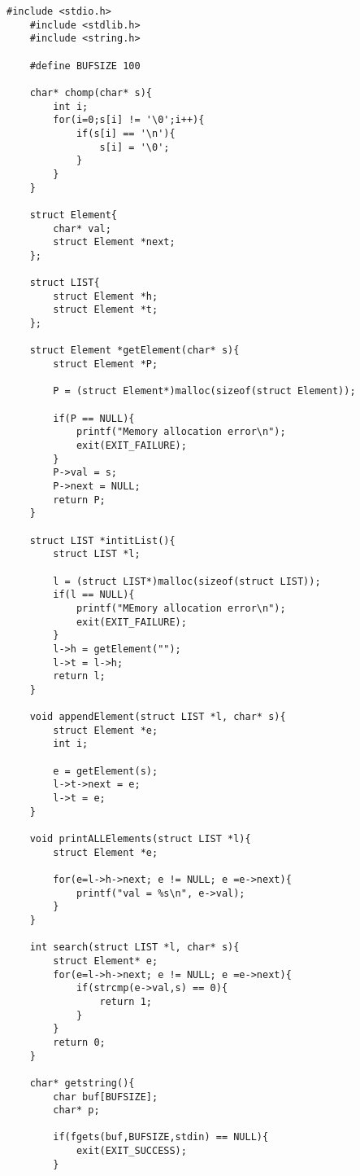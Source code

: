 \documentclass[fontsize = 10pt, paper= a4,twocolumn,column_gap=3zw]{jlreq}
\begin{document}
\begin{lstlisting}[basicstyle=\ttfamily\footnotesize, frame=single, caption=s2212022-2.c ,label=s2212022-2.c]
    #include <stdio.h>
    #include <stdlib.h>
    #include <string.h>

    #define BUFSIZE 100

    char* chomp(char* s){
        int i;
        for(i=0;s[i] != '\0';i++){
            if(s[i] == '\n'){
                s[i] = '\0';
            }
        }
    }

    struct Element{
        char* val;
        struct Element *next;
    };

    struct LIST{
        struct Element *h;
        struct Element *t;
    };

    struct Element *getElement(char* s){
        struct Element *P;

        P = (struct Element*)malloc(sizeof(struct Element));

        if(P == NULL){
            printf("Memory allocation error\n");
            exit(EXIT_FAILURE);
        }
        P->val = s;
        P->next = NULL;
        return P;
    }

    struct LIST *intitList(){
        struct LIST *l;

        l = (struct LIST*)malloc(sizeof(struct LIST));
        if(l == NULL){
            printf("MEmory allocation error\n");
            exit(EXIT_FAILURE);
        }
        l->h = getElement("");
        l->t = l->h;
        return l;
    }

    void appendElement(struct LIST *l, char* s){
        struct Element *e;
        int i;

        e = getElement(s);
        l->t->next = e;
        l->t = e;
    }

    void printALLElements(struct LIST *l){
        struct Element *e;

        for(e=l->h->next; e != NULL; e =e->next){
            printf("val = %s\n", e->val);
        }
    }

    int search(struct LIST *l, char* s){
        struct Element* e;
        for(e=l->h->next; e != NULL; e =e->next){
            if(strcmp(e->val,s) == 0){
                return 1;
            }
        }
        return 0;
    }

    char* getstring(){
        char buf[BUFSIZE];
        char* p;
        
        if(fgets(buf,BUFSIZE,stdin) == NULL){
            exit(EXIT_SUCCESS);
        }


\end{lstlisting}
\end{document}
